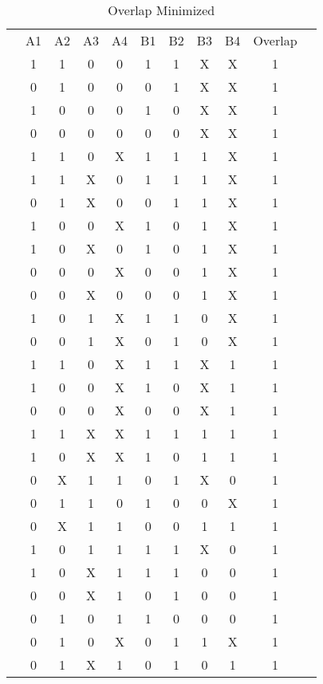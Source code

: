 \documentclass[letterpaper,titlepage,oneside]{article}
\begin{document}
\begin{table}[h!]
\begin{center}

\caption{Overlap Minimized}\label{table:OverLap_Minimized}
\begin{tabular}{c|c|c|c|c|c|c|c|c|c|c}
\cline{2-10}
 & A1 & A2 & A3 & A4 & B1 & B2 & B3 & B4 & Overlap &  \\ \cline{2-10}
 & 1 & 1 & 0 & 0 & 1 & 1 & X & X & 1 &  \\
 & 0 & 1 & 0 & 0 & 0 & 1 & X & X & 1 &  \\
 & 1 & 0 & 0 & 0 & 1 & 0 & X & X & 1 &  \\
 & 0 & 0 & 0 & 0 & 0 & 0 & X & X & 1 &  \\
 & 1 & 1 & 0 & X & 1 & 1 & 1 & X & 1 &  \\
 & 1 & 1 & X & 0 & 1 & 1 & 1 & X & 1 &  \\
 & 0 & 1 & X & 0 & 0 & 1 & 1 & X & 1 &  \\
 & 1 & 0 & 0 & X & 1 & 0 & 1 & X & 1 &  \\
 & 1 & 0 & X & 0 & 1 & 0 & 1 & X & 1 &  \\
 & 0 & 0 & 0 & X & 0 & 0 & 1 & X & 1 &  \\
 & 0 & 0 & X & 0 & 0 & 0 & 1 & X & 1 &  \\
 & 1 & 0 & 1 & X & 1 & 1 & 0 & X & 1 &  \\
 & 0 & 0 & 1 & X & 0 & 1 & 0 & X & 1 &  \\
 & 1 & 1 & 0 & X & 1 & 1 & X & 1 & 1 &  \\
 & 1 & 0 & 0 & X & 1 & 0 & X & 1 & 1 &  \\
 & 0 & 0 & 0 & X & 0 & 0 & X & 1 & 1 &  \\
 & 1 & 1 & X & X & 1 & 1 & 1 & 1 & 1 &  \\
 & 1 & 0 & X & X & 1 & 0 & 1 & 1 & 1 &  \\
 & 0 & X & 1 & 1 & 0 & 1 & X & 0 & 1 &  \\
 & 0 & 1 & 1 & 0 & 1 & 0 & 0 & X & 1 &  \\
 & 0 & X & 1 & 1 & 0 & 0 & 1 & 1 & 1 &  \\
 & 1 & 0 & 1 & 1 & 1 & 1 & X & 0 & 1 &  \\
 & 1 & 0 & X & 1 & 1 & 1 & 0 & 0 & 1 &  \\
 & 0 & 0 & X & 1 & 0 & 1 & 0 & 0 & 1 &  \\
 & 0 & 1 & 0 & 1 & 1 & 0 & 0 & 0 & 1 &  \\
 & 0 & 1 & 0 & X & 0 & 1 & 1 & X & 1 &  \\
 & 0 & 1 & X & 1 & 0 & 1 & 0 & 1 & 1 &  \\
\cline{2-10}
\end{tabular}


\end{center}
\end{table}
\end{document}
